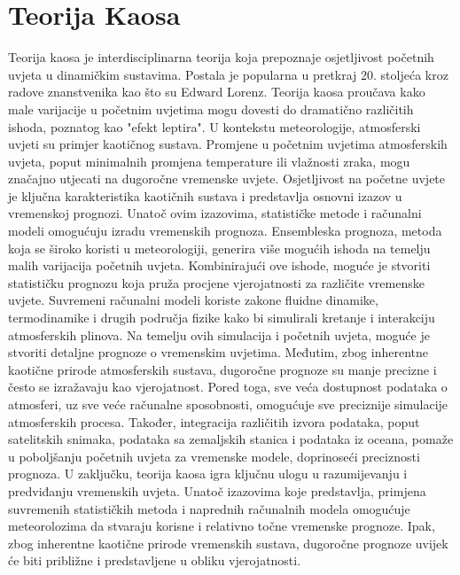 \documentclass[times, utf8, zavrsni]{fer}
\begin{document}
\chapter{Teorija Kaosa}
Teorija kaosa je interdisciplinarna teorija koja prepoznaje osjetljivost početnih uvjeta u dinamičkim sustavima. Postala je popularna u pretkraj 20. stoljeća kroz radove znanstvenika kao što su Edward Lorenz. Teorija kaosa proučava kako male varijacije u početnim uvjetima mogu dovesti do dramatično različitih ishoda, poznatog kao "efekt leptira". U kontekstu meteorologije, atmosferski uvjeti su primjer kaotičnog sustava. Promjene u početnim uvjetima atmosferskih uvjeta, poput minimalnih promjena temperature ili vlažnosti zraka, mogu značajno utjecati na dugoročne vremenske uvjete. Osjetljivost na početne uvjete je ključna karakteristika kaotičnih sustava i predstavlja osnovni izazov u vremenskoj prognozi. Unatoč ovim izazovima, statističke metode i računalni modeli omogućuju izradu vremenskih prognoza. Ensembleska prognoza, metoda koja se široko koristi u meteorologiji, generira više mogućih ishoda na temelju malih varijacija početnih uvjeta. Kombinirajući ove ishode, moguće je stvoriti statističku prognozu koja pruža procjene vjerojatnosti za različite vremenske uvjete. Suvremeni računalni modeli koriste zakone fluidne dinamike, termodinamike i drugih područja fizike kako bi simulirali kretanje i interakciju atmosferskih plinova. Na temelju ovih simulacija i početnih uvjeta, moguće je stvoriti detaljne prognoze o vremenskim uvjetima. Međutim, zbog inherentne kaotične prirode atmosferskih sustava, dugoročne prognoze su manje precizne i često se izražavaju kao vjerojatnost. Pored toga, sve veća dostupnost podataka o atmosferi, uz sve veće računalne sposobnosti, omogućuje sve preciznije simulacije atmosferskih procesa. Također, integracija različitih izvora podataka, poput satelitskih snimaka, podataka sa zemaljskih stanica i podataka iz oceana, pomaže u poboljšanju početnih uvjeta za vremenske modele, doprinoseći preciznosti prognoza. U zaključku, teorija kaosa igra ključnu ulogu u razumijevanju i predviđanju vremenskih uvjeta. Unatoč izazovima koje predstavlja, primjena suvremenih statističkih metoda i naprednih računalnih modela omogućuje meteorolozima da stvaraju korisne i relativno točne vremenske prognoze. Ipak, zbog inherentne kaotične prirode vremenskih sustava, dugoročne prognoze uvijek će biti približne i predstavljene u obliku vjerojatnosti.
\end{document}
